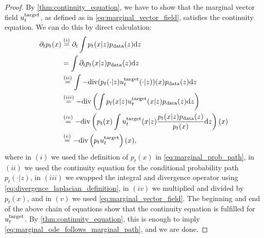 \begin{proof}
By \cref{thm:continuity_equation}, we have to show that the marginal vector field $u^{\text{target}}_t$, as defined as in \cref{eq:marginal_vector_field}, satisfies the continuity equation. We can do this by direct calculation:
\begin{align*}
\partial_t p_t(x) &\overset{(i)}
{=} \partial_t\int p_t(x|z) p_{\rm{data}} (z) \mathrm{d} z\\
&= \int \partial_t p_t(x|z) p_{\rm{data}} (z) \mathrm{d} z\\
&\overset{(ii)}{=} \int -\mathrm{div} (p_t(\cdot|z)u^{\text{target}}_t(\cdot|z))(x) p_{\rm{data}} (z) \mathrm{d} z\\
&\overset{(iii)}{=} -\mathrm{div} \left(\int p_t(x|z) u^{\text{target}}_t(x|z)p_{\rm{data}}(z) \mathrm{d} z\right)\\
&\overset{(iv)}{=} -\mathrm{div} \left(p_t(x)\int u^{\text{target}}_t(x|z) \frac{p_t(x|z)p_{\rm{data}}(z)}{p_t(x)}\mathrm{d} z\right)(x)\\
&\overset{(v)}{=} -\mathrm{div} \left(p_tu^{\text{target}}_t\right)(x),
\end{align*}
where in $(i)$ we used the definition of $p_t(x)$ in \cref{eq:marginal_prob_path}, in $(ii)$ we used the continuity equation for the conditional probability path $p_t(\cdot|z)$, in $(iii)$ we swapped the integral and divergence operator using \cref{eq:divergence_laplacian_definition}, in $(iv)$ we multiplied and divided by $p_t(x)$, and in $(v)$ we used \cref{eq:marginal_vector_field}. The beginning and end of the above chain of equations show that the continuity equation is fulfilled for $u^{\text{target}}_t$. By \cref{thm:continuity_equation}, this is enough to imply \cref{eq:marginal_ode_follows_marginal_path}, and we are done.
\end{proof}


